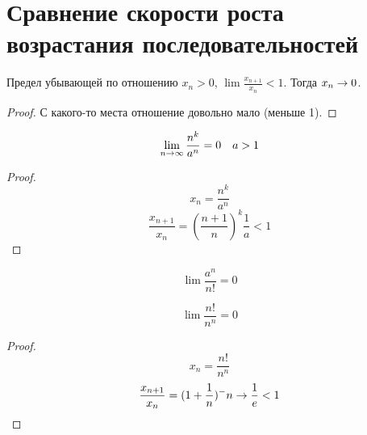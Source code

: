 ﻿\section{Сравнение скорости роста возрастания последовательностей}

\begin{theorem}{Предел убывающей по отношению}
$x_n > 0$, $\lim \frac{x_{n+1}}{x_n} < 1$. Тогда $x_n \rightarrow 0$.
\end{theorem}
\begin{proof}
С какого-то места отношение довольно мало (меньше 1).
\end{proof}
\begin{conseq}
$$\lim_{n\rightarrow\infty} \frac{n^k}{a^n} = 0\quad a>1$$
\end{conseq}
\begin{proof}
$$x_n = \frac{n^k}{a^n}$$
$$\frac{x_{n+1}}{x_n} = \left(\frac{n+1}n\right)^k \frac1a < 1$$
\end{proof}
\begin{conseq}
$$\lim \frac{a^n}{n!} = 0$$
\end{conseq}

\begin{conseq}
$$\lim \frac{n!}{n^n} = 0$$
\end{conseq}
\begin{proof}
$$x_n = \frac{n!}{n^n}$$
$$\frac{x_{n+1}}{x_n} = (1+\frac1n)^-n \rightarrow \frac1e < 1$$
\end{proof}

